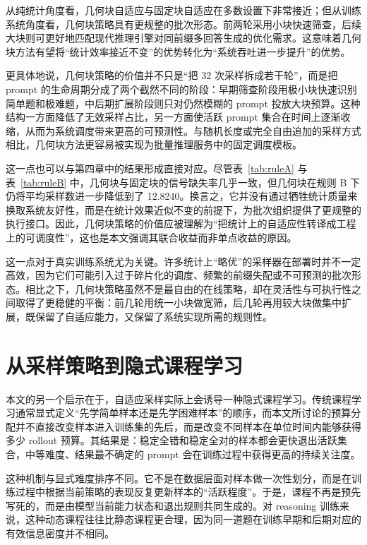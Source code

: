 从纯统计角度看，几何块自适应与固定块自适应在多数设置下非常接近；但从训练系统角度看，几何块策略具有更规整的批次形态。前两轮采用小块快速筛查，后续大块则可更好地匹配现代推理引擎对同前缀多回答生成的优化需求\citep{xu2026kvcacheoptimizationstrategies,jaillet2025online,dong2025accelerating}。这意味着几何块方法有望将“统计效率接近不变”的优势转化为“系统吞吐进一步提升”的优势。

更具体地说，几何块策略的价值并不只是“把 32 次采样拆成若干轮”，而是把 prompt 的生命周期分成了两个截然不同的阶段：早期筛查阶段用极小块快速识别简单题和极难题，中后期扩展阶段则只对仍然模糊的 prompt 投放大块预算。这种结构一方面降低了无效采样占比，另一方面使活跃 prompt 集合在时间上逐渐收缩，从而为系统调度带来更高的可预测性。与随机长度或完全自由追加的采样方式相比，几何块方法更容易被实现为批量推理服务中的固定调度模板。

这一点也可以与第四章中的结果形成直接对应。尽管表~\ref{tab:ruleA} 与表~\ref{tab:ruleB} 中，几何块与固定块的信号缺失率几乎一致，但几何块在规则 B 下仍将平均采样数进一步降低到了 12.8240。换言之，它并没有通过牺牲统计质量来换取系统友好性，而是在统计效果近似不变的前提下，为批次组织提供了更规整的执行接口。因此，几何块策略的价值应被理解为“把统计上的自适应性转译成工程上的可调度性”，这也是本文强调其联合收益而非单点收益的原因。

这一点对于真实训练系统尤为关键。许多统计上“略优”的采样器在部署时并不一定高效，因为它们可能引入过于碎片化的调度、频繁的前缀失配或不可预测的批次形态。相比之下，几何块策略虽然不是最自由的在线策略，却在灵活性与可执行性之间取得了更稳健的平衡：前几轮用统一小块做宽筛，后几轮再用较大块做集中扩展，既保留了自适应能力，又保留了系统实现所需的规则性。

\section{从采样策略到隐式课程学习}

本文的另一个启示在于，自适应采样实际上会诱导一种隐式课程学习。传统课程学习通常显式定义“先学简单样本还是先学困难样本”的顺序，而本文所讨论的预算分配并不直接改变样本进入训练集的先后，而是改变不同样本在单位时间内能够获得多少 rollout 预算。其结果是：稳定全错和稳定全对的样本都会更快退出活跃集合，中等难度、结果最不确定的 prompt 会在训练过程中获得更高的持续关注度。

这种机制与显式难度排序不同。它不是在数据层面对样本做一次性划分，而是在训练过程中根据当前策略的表现反复更新样本的“活跃程度”。于是，课程不再是预先写死的，而是由模型当前能力状态和退出规则共同生成的。对 reasoning 训练来说，这种动态课程往往比静态课程更合理，因为同一道题在训练早期和后期对应的有效信息密度并不相同。

